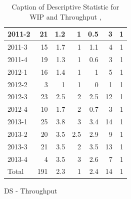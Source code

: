 \documentclass[UKenglish]{ifimaster}  %
\begin{document}
\begin{appendices}
\begin{table}[!htbp]
\begin{adjustwidth}{-1.5cm}{}
\begin{subfigure}[b]{0.3\textwidth}
{\begin{tabular}{ | l | r | r | r | r | r | r | }
 2011-2  & 21 & 1.2 & 1 & 0.5 & 3 & 1 \\ \hline
 2011-3  & 15 & 1.7 & 1 & 1.1 & 4 & 1 \\ \hline
 2011-4  & 19 & 1.3 & 1 & 0.6 & 3 & 1 \\ \hline
 2012-1  & 16 & 1.4 & 1 & 1 & 5 & 1 \\ \hline
 2012-2  & 3 & 1 & 1 & 0 &1 & 1 \\ \hline
 2012-3  & 23 & 2.5 & 2 & 2.5 & 12 & 1 \\ \hline
 2012-4  & 10 & 1.7 & 2 & 0.7 & 3 & 1 \\ \hline
 2013-1  & 25 & 3.8 & 3 & 3.4 & 14 & 1 \\ \hline
 2013-2  & 20 & 3.5 & 2.5 & 2.9 & 9 & 1 \\ \hline
 2013-3  & 21 & 3.5 & 2 & 3.5 & 13 & 1 \\ \hline
 2013-4  & 4 & 3.5 & 3 & 2.6 & 7 & 1 \\ \hline
 Total  & 191 & 2.3 & 1 & 2.4 & 14 & 1 \\ \hline
\end{tabular}
}
\caption{DS - Throughput}
 \label{DS:Throughput:8}
\end{subfigure}
\end{adjustwidth}
\caption[Optional caption for list of figures]{Caption of Descriptive Statistic for WIP and Throughput  , }
\label{DS:8:1}
\end{table}


\end{appendices}
\end{document}

